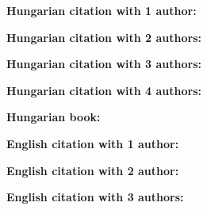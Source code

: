 \documentclass[12pt,a4paper,oneside,openright]{report}
\begin{document}
\textbf{Hungarian citation with 1 author:} \cite{mezei_1999}

\textbf{Hungarian citation with 2 authors:} \cite{david_snijders}

\textbf{Hungarian citation with 3 authors:} \cite{gyuris_molnar_szanto_1992}

\textbf{Hungarian citation with 4 authors:} \cite{benyei_guraly_gyori_mezei_2000}

\textbf{Hungarian book:} \cite{gyori_guraly_pelle_grof_2006}

\textbf{English citation with 1 author:} \cite{cordray_pion_1991}

\textbf{English citation with 2 author:} \cite{tauber_siebel_1991}

\textbf{English citation with 3 authors:} \cite{berk_kriegler_ylviasker_2005}

\newpage

\printbibliography
\end{document}

